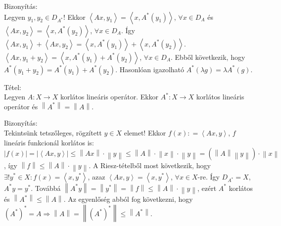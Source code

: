 \documentclass[12pt,a4paper]{scrartcl}
\newenvironment{tetel}{}{}
\newenvironment{bizonyitas}{}{}
\begin{document}
\begin{bizonyitas}

Bizonyítás:\\
Legyen \(y_{1},y_{2} \in D_{A^{*}}\)! Ekkor
\(\left\langle {Ax,y_{1}} \right\rangle = \left\langle {x,A^{*}\left( y_{1} \right)} \right\rangle\),
\(\forall x \in D_{A}\) és
\(\left\langle {Ax,y_{2}} \right\rangle = \left\langle {x,A^{*}\left( y_{2} \right)} \right\rangle\),
\(\forall x \in D_{A}\). Így
\(\left\langle {Ax,y_{1}} \right\rangle + \left\langle {Ax,y_{2}} \right\rangle = \left\langle {x,A^{*}\left( y_{1} \right)} \right\rangle + \left\langle {x,A^{*}\left( y_{2} \right)} \right\rangle\).
\(\left\langle {Ax,y_{1} + y_{2}} \right\rangle = \left\langle {x,A^{*}\left( y_{1} \right) + A^{*}\left( y_{2} \right)} \right\rangle\),
\(\forall x \in D_{A}\). Ebből következik, hogy
\(A^{*}\left( {y_{1} + y_{2}} \right) = A^{*}\left( y_{1} \right) + A^{*}\left( y_{2} \right)\).
Hasonlóan igazolható
\(A^{*}\left( {\lambda g} \right) = \lambda A^{*}\left( g \right)\).

\end{bizonyitas}

\begin{tetel}

Tétel:\\
Legyen \(\left. A:X\rightarrow X \right.\) korlátos lineáris operátor.
Ekkor \(\left. A^{*}:X\rightarrow X \right.\) korlátos lineáris operátor
és \(\left\| A^{*} \right\| = \left\| A \right\|\).

\end{tetel}

\begin{bizonyitas}

Bizonyítás:\\
Tekintsünk tetszőleges, rögzített \(y \in X\) elemet! Ekkor
\(f\left( x \right): = \left\langle {Ax,y} \right\rangle\), \(f\)
lineáris funkcionál korlátos is:
\(\left| {f\left( x \right)} \right| = \left| \left\langle {Ax,y} \right\rangle \right| \leq \left\| {Ax} \right\| \cdot \left\| y \right\| \leq \left\| A \right\| \cdot \left\| x \right\| \cdot \left\| y \right\| = \left( {\left\| A \right\|\left\| y \right\|} \right) \cdot \left\| x \right\|\),
így
\(\left\| f \right\| \leq \left\| A \right\| \cdot \left\| y \right\|\).
A Riesz-tételből most következik, hogy
\(\exists!y^{*} \in X:f\left( x \right) = \left\langle {x,y^{*}} \right\rangle\),
azaz
\(\left\langle {Ax,y} \right\rangle = \left\langle {x,y^{*}} \right\rangle\),
\(\forall x \in X\)-re. Így \(D_{A^{*}} = X\), \(A^{*}y = y^{*}\).
Továbbá
\(\left\| {A^{*}y} \right\| = \left\| y^{*} \right\| = \left\| f \right\| \leq \left\| A \right\| \cdot \left\| y \right\|\),
ezért \(A^{*}\) korlátos és
\(\left\| A^{*} \right\| \leq \left\| A \right\|\). Az egyenlőség abból
fog következni, hogy
\(\left. \left( A^{*} \right)^{*} = A\Rightarrow\left\| A \right\| = \left\| \left( A^{*} \right)^{*} \right\| \leq \left\| A^{*} \right\| \right.\).

\end{bizonyitas}
\end{document}
